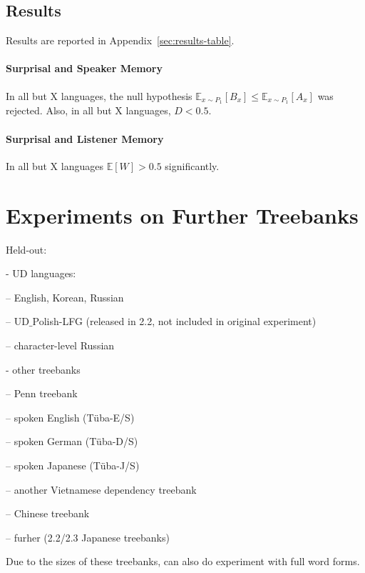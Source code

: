 \documentclass[11pt,letterpaper]{article}
\newcommand{\E}[0]{\mathbb{E}}
\begin{document}
\subsection{Results}


Results are reported in Appendix~\ref{sec:results-table}.

\paragraph{Surprisal and Speaker Memory}
In all but X languages, the null hypothesis $\E_{x \sim P_1} [B_x] \leq \E_{x \sim P_1}[A_x]$ was rejected.
Also, in all but X languages, $D < 0.5$.

\paragraph{Surprisal and Listener Memory}
In all but X languages $\E[W] > 0.5$ significantly.



\section{Experiments on Further Treebanks}



Held-out:

- UD languages:

-- English, Korean, Russian

-- UD$\_$Polish-LFG (released in 2.2, not included in original experiment)

-- character-level Russian

- other treebanks

-- Penn treebank \citep{marcus-building-1993}

-- spoken English (T{\"u}ba-E/S)

-- spoken German (T{\"u}ba-D/S)

-- spoken Japanese (T{\"u}ba-J/S)

-- another Vietnamese dependency treebank \citep{nguyen-bktreebank:-2017}

-- Chinese treebank \citep{xue-chinese-2013}

-- furher (2.2/2.3 Japanese treebanks)

Due to the sizes of these treebanks, can also do experiment with full word forms.





\appendix
\end{document}
